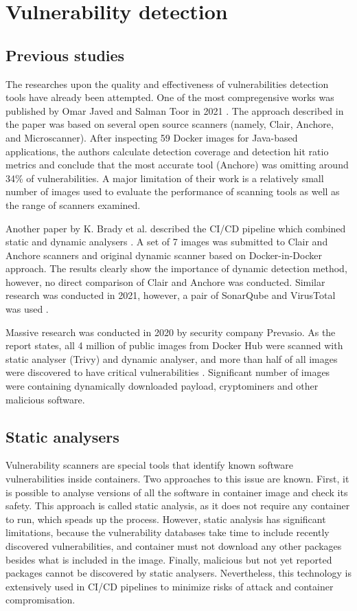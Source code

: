 \section{Vulnerability detection}
\subsection{Previous studies}

The researches upon the quality and effectiveness of vulnerabilities detection tools have already been attempted. One of the most compregensive works was published by Omar Javed and Salman Toor in 2021 \cite{arxiv:1}. The approach described in the paper was based on several open source scanners (namely, Clair, Anchore, and Microscanner). After inspecting 59 Docker images for Java-based applications, the authors calculate detection coverage and detection hit ratio metrics and conclude that the most accurate tool (Anchore) was omitting around 34\% of vulnerabilities. A major limitation of their work is a relatively small number of images used to evaluate the performance of scanning tools as well as the range of scanners examined.

Another paper by K. Brady et al. described the CI/CD pipeline which combined static and dynamic analysers \cite{c:2}. A set of 7 images was submitted to Clair and Anchore scanners and original dynamic scanner based on Docker-in-Docker approach. The results clearly show the importance of dynamic detection method, however, no direct comparison of Clair and Anchore was conducted. Similar research was conducted in 2021, however, a pair of SonarQube and VirusTotal was used \cite{c:3}.

Massive research was conducted in 2020 by security company Prevasio. As the report states, all 4 million of public images from Docker Hub were scanned with static analyser (Trivy) and dynamic analyser, and more than half of all images were discovered to have critical vulnerabilities \cite{report:dynamic}. Significant number of images were containing dynamically downloaded payload, cryptominers and other malicious software.

\clearpage
\subsection{Static analysers}

Vulnerability scanners are special tools that identify known software vulnerabilities inside containers. Two approaches to this issue are known. First, it is possible to analyse versions of all the software in container image and check its safety. This approach is called static analysis, as it does not require any container to run, which speads up the process. However, static analysis has significant limitations, because the vulnerability databases take time to include recently discovered vulnerabilities, and container must not download any other packages besides what is included in the image. Finally, malicious but not yet reported packages cannot be discovered by static analysers. Nevertheless, this technology is extensively used in CI/CD pipelines to minimize risks of attack and container compromisation.

